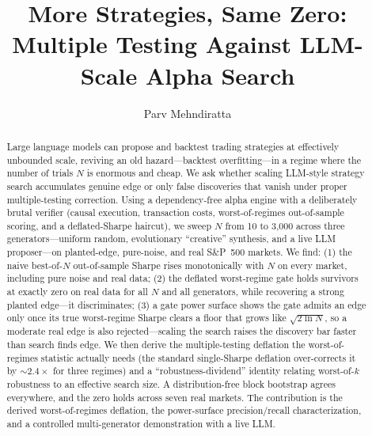 \documentclass[sigconf,review,anonymous]{acmart}
\begin{document}
\title{More Strategies, Same Zero: Multiple Testing Against LLM-Scale Alpha Search}

\author{Parv Mehndiratta}

\begin{abstract}
Large language models can propose and backtest trading strategies at effectively unbounded scale, reviving an old hazard---backtest overfitting---in a regime where the number of trials $N$ is enormous and cheap. We ask whether scaling LLM-style strategy search accumulates genuine edge or only false discoveries that vanish under proper multiple-testing correction. Using a dependency-free alpha engine with a deliberately brutal verifier (causal execution, transaction costs, worst-of-regimes out-of-sample scoring, and a deflated-Sharpe haircut), we sweep $N$ from 10 to 3{,}000 across three generators---uniform random, evolutionary ``creative'' synthesis, and a live LLM proposer---on planted-edge, pure-noise, and real S\&P~500 markets. We find: (1) the naive best-of-$N$ out-of-sample Sharpe rises monotonically with $N$ on every market, including pure noise and real data; (2) the deflated worst-regime gate holds survivors at exactly zero on real data for all $N$ and all generators, while recovering a strong planted edge---it discriminates; (3) a gate power surface shows the gate admits an edge only once its true worst-regime Sharpe clears a floor that grows like $\sqrt{2\ln N}$, so a moderate real edge is also rejected---scaling the search raises the discovery bar faster than search finds edge. We then derive the multiple-testing deflation the worst-of-regimes statistic actually needs (the standard single-Sharpe deflation over-corrects it by ${\sim}2.4\times$ for three regimes) and a ``robustness-dividend'' identity relating worst-of-$k$ robustness to an effective search size. A distribution-free block bootstrap agrees everywhere, and the zero holds across seven real markets. The contribution is the derived worst-of-regimes deflation, the power-surface precision/recall characterization, and a controlled multi-generator demonstration with a live LLM.
\end{abstract}

\end{document}
